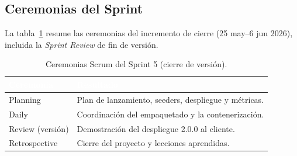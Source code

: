 \subsection{Ceremonias del Sprint}
\label{ssec:s5_ceremonias}
La tabla~\ref{tab:s5_ceremonias} resume las ceremonias del incremento de cierre
(25 may--6 jun 2026), incluida la \textit{Sprint Review} de fin de versión.

\clearpage
\begin{table}[!ht]
    \centering
    \renewcommand{\arraystretch}{1.3}
    \fontsize{9}{10.8}\selectfont\sffamily
    \begin{tabularx}{\textwidth}{|l|X|}
        \hline
        \rowcolor{colorPrimario}
        \textcolor{white}{\textbf{Ceremonia}} & \textcolor{white}{\textbf{Resultado}} \\ \hline
        Planning & Plan de lanzamiento, seeders, despliegue y métricas. \\ \hline
        \rowcolor{grisTecnico}
        Daily & Coordinación del empaquetado y la contenerización. \\ \hline
        Review (versión) & Demostración del despliegue 2.0.0 al cliente. \\ \hline
        \rowcolor{grisTecnico}
        Retrospective & Cierre del proyecto y lecciones aprendidas. \\ \hline
    \end{tabularx}
    \caption{Ceremonias Scrum del Sprint 5 (cierre de versión).}
    \label{tab:s5_ceremonias}
\end{table}

\clearpage

